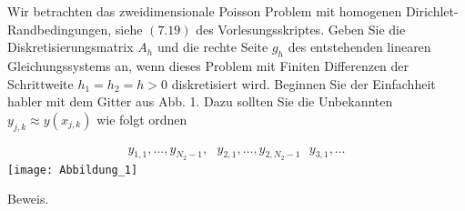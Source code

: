 \begin{exercise}
  Wir betrachten das zweidimensionale Poisson Problem mit homogenen
  Dirichlet-Randbedingungen, siehe $(7.19)$ des Vorlesungsskriptes. Geben Sie
  die Diskretisierungsmatrix $A_h$ und die rechte Seite $g_h$ des entstehenden
  linearen Gleichungssystems an, wenn dieses Problem mit Finiten Differenzen der
  Schrittweite $h_1 = h_2 = h > 0$ diskretisiert wird. Beginnen Sie der Einfachheit
  habler mit dem Gitter aus Abb. 1. Dazu sollten Sie die Unbekannten
  $y_{j,k} \approx y(x_{j,k})$ wie folgt ordnen

  \begin{align}\label{sec}
    y_{1,1}, \dots , y_{N_2 -1}, \text{ }
    y_{2,1}, \dots , y_{2,N_2 -1} \text{ }
    y_{3,1}, \dots
  \end{align}
  \texttt{[image: Abbildung\_1]}
  \end{exercise}

\begin{solution}
  Beweis.
\end{solution}
